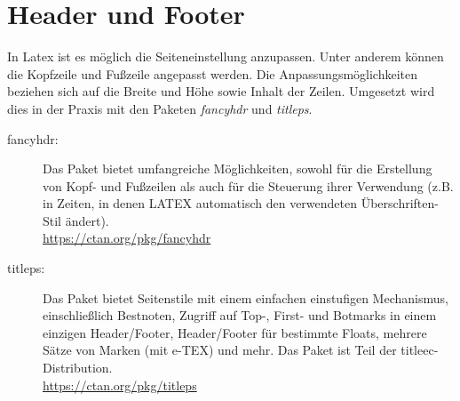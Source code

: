 \chapter{Header und Footer}

In Latex ist es möglich die Seiteneinstellung anzupassen. Unter anderem können die Kopfzeile und Fußzeile angepasst werden. Die Anpassungsmöglichkeiten beziehen sich auf die Breite und Höhe sowie Inhalt der Zeilen. Umgesetzt wird dies in der Praxis mit den Paketen \emph{fancyhdr} und \emph{titleps}. 

\begin{description}
	\item[fancyhdr:] Das Paket bietet umfangreiche Möglichkeiten, sowohl für die Erstellung von Kopf- und Fußzeilen als auch für die Steuerung ihrer Verwendung (z.B. in Zeiten, in denen LATEX automatisch den verwendeten Überschriften-Stil ändert).\\
	\url{https://ctan.org/pkg/fancyhdr}
	\item[titleps:] Das Paket bietet Seitenstile mit einem einfachen einstufigen Mechanismus, einschließlich Bestnoten, Zugriff auf Top-, First- und Botmarks in einem einzigen Header/Footer, Header/Footer für bestimmte Floats, mehrere Sätze von Marken (mit e-TEX) und mehr.
	Das Paket ist Teil der titleec-Distribution.\\
	\url{https://ctan.org/pkg/titleps}
\end{description}

